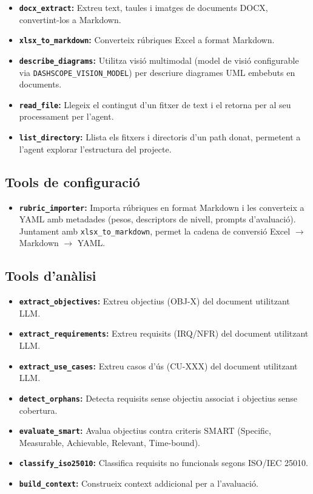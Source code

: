 \documentclass[12pt,a4paper,twoside]{report}
\begin{document}
\begin{itemize}
    \item \textbf{\texttt{docx\_extract}:} Extreu text, taules i imatges de documents DOCX, convertint-los a Markdown.
    \item \textbf{\texttt{xlsx\_to\_markdown}:} Converteix r\'ubriques Excel a format Markdown.
    \item \textbf{\texttt{describe\_diagrams}:} Utilitza visi\'o multimodal (model de visi\'o configurable via \texttt{DASHSCOPE\_VISION\_MODEL}) per descriure diagrames UML embebuts en documents.
    \item \textbf{\texttt{read\_file}:} Llegeix el contingut d'un fitxer de text i el retorna per al seu processament per l'agent.
    \item \textbf{\texttt{list\_directory}:} Llista els fitxers i directoris d'un path donat, permetent a l'agent explorar l'estructura del projecte.
\end{itemize}

\subsection{Tools de configuraci\'o}

\begin{itemize}
    \item \textbf{\texttt{rubric\_importer}:} Importa r\'ubriques en format Markdown i les converteix a YAML amb metadades (pesos, descriptors de nivell, prompts d'avaluaci\'o). Juntament amb \texttt{xlsx\_to\_markdown}, permet la cadena de conversi\'o Excel $\rightarrow$ Markdown $\rightarrow$ YAML.
\end{itemize}

\subsection{Tools d'an\`alisi}

\begin{itemize}
    \item \textbf{\texttt{extract\_objectives}:} Extreu objectius (OBJ-X) del document utilitzant LLM.
    \item \textbf{\texttt{extract\_requirements}:} Extreu requisits (IRQ/NFR) del document utilitzant LLM.
    \item \textbf{\texttt{extract\_use\_cases}:} Extreu casos d'\'us (CU-XXX) del document utilitzant LLM.
    \item \textbf{\texttt{detect\_orphans}:} Detecta requisits sense objectiu associat i objectius sense cobertura.
    \item \textbf{\texttt{evaluate\_smart}:} Avalua objectius contra criteris SMART (Specific, Measurable, Achievable, Relevant, Time-bound).
    \item \textbf{\texttt{classify\_iso25010}:} Classifica requisits no funcionals segons ISO/IEC 25010.
    \item \textbf{\texttt{build\_context}:} Construeix context addicional per a l'avaluaci\'o.
\end{itemize}
\end{document}
